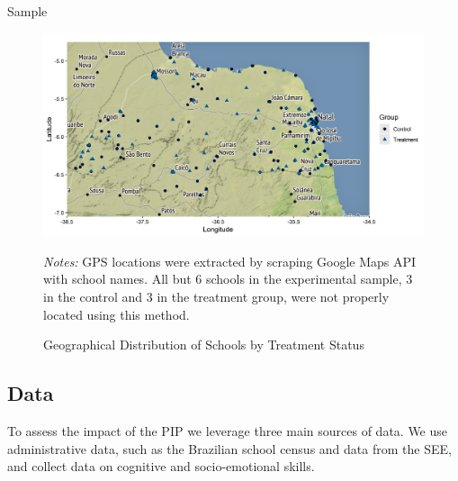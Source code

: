 \documentclass[11pt,a4paper]{article}
\begin{document}
	\begin{table}[ht!]
		\caption{Sample}
		\label{tab:sample}
		\centering
		
	\end{table}
	
	\begin{figure}[ht!]
		\caption{Geographical Distribution of Schools by Treatment Status}
		\label{fig:treat_map}
		\centering
		
		\includegraphics[width=15cm]{DataWork/Output/Figures/fig4-treat_map.png}
		
		\begin{minipage}{0.92\textwidth}
			\small{\textit{Notes:} GPS locations were extracted by scraping Google Maps API with school names. All but 6 schools in the experimental sample, 3 in the control and 3 in the treatment group, were not properly located using this method.}
		\end{minipage}
	\end{figure}
	
	\clearpage
	
	\subsection{Data} \label{sec:data}
	
	To assess the impact of the PIP we leverage three main sources of data. We use administrative data, such as the Brazilian school census and data from the SEE, and collect data on cognitive and socio-emotional skills.
	
\end{document}
